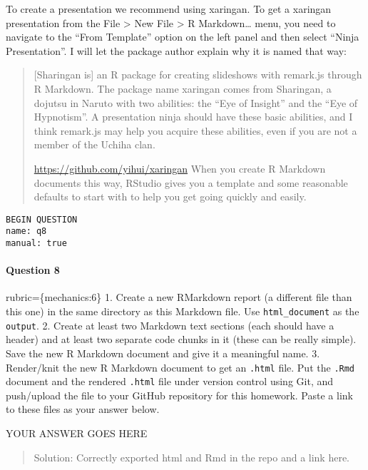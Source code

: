\documentclass[
]{article}
\begin{document}
To create a presentation we recommend using xaringan. To get a xaringan
presentation from the File \textgreater{} New File \textgreater{} R
Markdown\ldots{} menu, you need to navigate to the ``From Template''
option on the left panel and then select ``Ninja Presentation''. I will
let the package author explain why it is named that way:

\begin{quote}
{[}Sharingan is{]} an R package for creating slideshows with remark.js
through R Markdown. The package name xaringan comes from Sharingan, a
dojutsu in Naruto with two abilities: the ``Eye of Insight'' and the
``Eye of Hypnotism''. A presentation ninja should have these basic
abilities, and I think remark.js may help you acquire these abilities,
even if you are not a member of the Uchiha clan.

\url{https://github.com/yihui/xaringan} When you create R Markdown
documents this way, RStudio gives you a template and some reasonable
defaults to start with to help you get going quickly and easily.
\end{quote}

\begin{verbatim}
BEGIN QUESTION
name: q8
manual: true
\end{verbatim}

\begin{alert alert-info}
\hypertarget{question-8}{%
\paragraph{Question 8}\label{question-8}}

rubric=\{mechanics:6\} 1. Create a new RMarkdown report (a different
file than this one) in the same directory as this Markdown file. Use
\texttt{html\_document} as the \texttt{output}. 2. Create at least two
Markdown text sections (each should have a header) and at least two
separate code chunks in it (these can be really simple). Save the new R
Markdown document and give it a meaningful name. 3. Render/knit the new
R Markdown document to get an \texttt{.html} file. Put the \texttt{.Rmd}
document and the rendered \texttt{.html} file under version control
using Git, and push/upload the file to your GitHub repository for this
homework. Paste a link to these files as your answer below.
\end{alert alert-info}

YOUR ANSWER GOES HERE

\begin{quote}
Solution: Correctly exported html and Rmd in the repo and a link here.
\end{quote}
\end{document}
